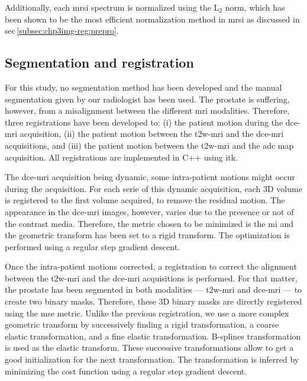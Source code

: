 Additionally, each \ac{mrsi} spectrum is normalized using the L$_2$ norm, which has been shown to be the most efficient normalization method in \ac{mrsi} as discussed in \acs{sec}\,\ref{subsec:chp3img-reg:prepro}.

\subsection{Segmentation and registration}\label{subsec:chp6:method:Seg-Reg}

For this study, no segmentation method has been developed and the manual segmentation given by our radiologist has been used.
The prostate is suffering, however, from a misalignment between the different \ac{mri} modalities.
Therefore, three registrations have been developed to: (i) the patient motion during the \ac{dce}-\ac{mri} acquisition, (ii) the patient motion between the \ac{t2w}-\ac{mri} and the \ac{dce}-\ac{mri} acquisitions, and (iii) the patient motion between the \ac{t2w}-\ac{mri} and the \ac{adc} map acquisition.
All registrations are implemented in C++ using \ac{itk}.

The \ac{dce}-\ac{mri} acquisition being dynamic, some intra-patient motions might occur during the acquisition.
For each serie of this dynamic acquisition, each 3D volume is registered to the first volume acquired, to remove the residual motion.
The appearance in the \ac{dce}-\ac{mri} images, however, varies due to the presence or not of the contrast media.
Therefore, the metric chosen to be minimized is the \ac{mi} and the geometric transform has been set to a rigid transform.
The optimization is performed using a regular step gradient descent.

Once the intra-patient motions corrected, a registration to correct the alignment between the \ac{t2w}-\ac{mri} and the \ac{dce}-\ac{mri} acquisitions is performed.
For that matter, the prostate has been segmented in both modalities --- \ac{t2w}-\ac{mri} and \ac{dce}-\ac{mri} --- to create two binary masks.
Therefore, these 3D binary masks are directly registered using the \ac{mse} metric.
Unlike the previous registration, we use a more complex geometric transform by successively finding a rigid transformation, a coarse elastic transformation, and a fine elastic transformation.
B-splines transformation is used as the elastic transform.
These successive transformations allow to get a good initialization for the next transformation.
The transformation is inferred by minimizing the cost function using a regular step gradient descent.


